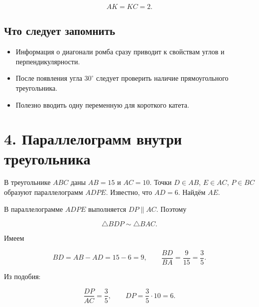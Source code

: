 \documentclass[a4paper,12pt]{article}
\begin{document}
\[
\boxed{AK=KC=2}.
\]

\subsection*{\color{darkaccent}Что следует запомнить}

\begin{itemize}
    \item Информация о диагонали ромба сразу приводит к свойствам углов и перпендикулярности.
    \item После появления угла $30^\circ$ следует проверить наличие прямоугольного треугольника.
    \item Полезно вводить одну переменную для короткого катета.
\end{itemize}

\section*{\color{darkaccent}4. Параллелограмм внутри треугольника}

В треугольнике $ABC$ даны $AB=15$ и $AC=10$. Точки $D\in AB$, $E\in AC$, $P\in BC$ образуют параллелограмм $ADPE$. Известно, что $AD=6$. Найдём $AE$.

\begin{center}
\end{center}

В параллелограмме $ADPE$ выполняется $DP\parallel AC$. Поэтому

\[
\triangle BDP\sim\triangle BAC.
\]

Имеем

\[
BD=AB-AD=15-6=9,
\qquad
\frac{BD}{BA}=\frac{9}{15}=\frac35.
\]

Из подобия:

\[
\frac{DP}{AC}=\frac35,
\qquad
DP=\frac35\cdot 10=6.
\]
\end{document}
